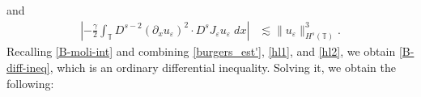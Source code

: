 \documentclass[12pt,reqno]{amsart}
\newcommand{\p}{\partial}
\newcommand{\ci}{\mathbb{T}}
\newcommand{\ee}{\varepsilon}
\theoremstyle{plain}  %
\theoremstyle{definition}
\begin{document}
%
%
%
%
%
%
and 
%
%
\begin{equation}
\label{hl2}
\begin{split}
\left | - \frac{\gamma}{2} \int_\ci D^{s-2} (\p_x u_\ee)^2 \cdot
D^s J_\ee u_\ee \; dx \right |
& \lesssim \|u_\ee\|_{H^s(\ci)}^3.
\end{split}
\end{equation}
%
%
%
Recalling \eqref{B-moli-int} and combining \eqref{burgers_est'}, 
\eqref{hl1}, and \eqref{hl2}, we obtain
\eqref{B-diff-ineq}, which is an ordinary differential inequality. Solving  
it, we obtain the following:

%  
% 
%
%
%   
%
\end{document}
